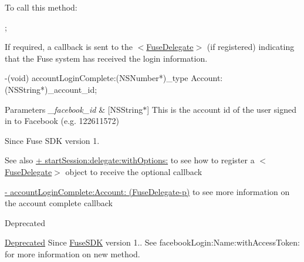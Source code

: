 To call this method\+:


\begin{DoxyCode}
;
\end{DoxyCode}


If required, a callback is sent to the $<$\hyperlink{protocol_fuse_delegate-p}{Fuse\+Delegate}$>$ (if registered) indicating that the Fuse system has received the login information.


\begin{DoxyCode}
-(void) accountLoginComplete:(NSNumber*)\_type Account:(NSString*)\_account\_id;
\end{DoxyCode}



\begin{DoxyParams}{Parameters}
{\em \+\_\+facebook\+\_\+id} & \mbox{[}N\+S\+String$\ast$\mbox{]} This is the account id of the user signed in to Facebook (e.\+g. 122611572) \\
\hline
\end{DoxyParams}
\begin{DoxySince}{Since}
Fuse S\+D\+K version 1. 
\end{DoxySince}
\begin{DoxySeeAlso}{See also}
\hyperlink{interface_fuse_s_d_k_adf7ed64a02b9540c9ded4b931ea4e400}{+ start\+Session\+:delegate\+:with\+Options\+:} to see how to register a $<$\hyperlink{protocol_fuse_delegate-p}{Fuse\+Delegate}$>$ object to receive the optional callback 

\hyperlink{protocol_fuse_delegate-p_a54a18530604a7ceeb0e9419fc7fa3345}{-\/ account\+Login\+Complete\+:\+Account\+: (\+Fuse\+Delegate-\/p)} to see more information on the account complete callback 
\end{DoxySeeAlso}
\begin{DoxyRefDesc}{Deprecated}
\item[\hyperlink{deprecated__deprecated000002}{Deprecated}]Since \hyperlink{interface_fuse_s_d_k}{Fuse\+S\+D\+K} version 1.. See facebook\+Login\+:\+Name\+:with\+Access\+Token\+: for more information on new method. \end{DoxyRefDesc}
\hypertarget{interface_fuse_s_d_k_a38487be821059910b1b939d818cd0e9f}{}
